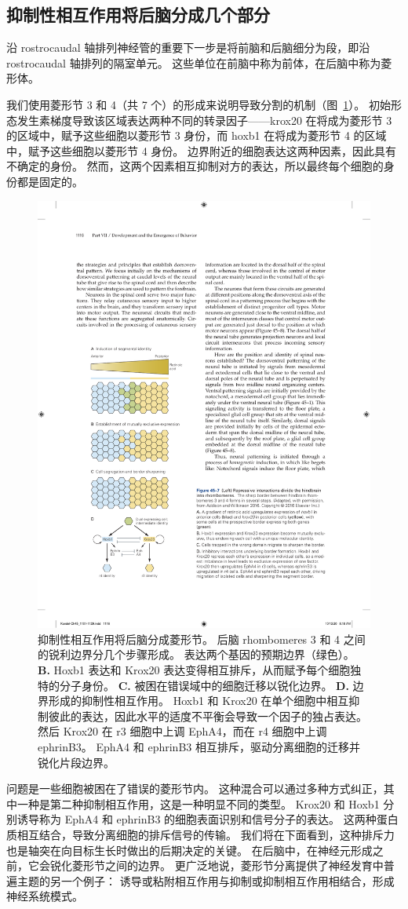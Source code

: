 \subsection{抑制性相互作用将后脑分成几个部分}

沿 rostrocaudal 轴排列神经管的重要下一步是将前脑和后脑细分为段，即沿 rostrocaudal 轴排列的隔室单元。
这些单位在前脑中称为前体，在后脑中称为菱形体。


我们使用菱形节 3 和 4（共 7 个）的形成来说明导致分割的机制（图~\ref{fig:45_7}）。
初始形态发生素梯度导致该区域表达两种不同的转录因子——krox20 在将成为菱形节 3 的区域中，赋予这些细胞以菱形节 3 身份，而 hoxb1 在将成为菱形节 4 的区域中，赋予这些细胞以菱形节 4 身份。
边界附近的细胞表达这两种因素，因此具有不确定的身份。
然而，这两个因素相互抑制对方的表达，所以最终每个细胞的身份都是固定的。


\begin{figure}[htbp]
	\centering
	\includegraphics[width=0.5\linewidth]{chap45/fig_45_7}
	\caption{抑制性相互作用将后脑分成菱形节。
		后脑 rhombomeres 3 和 4 之间的锐利边界分几个步骤形成\cite{addison2016segment}。
		表达两个基因的预期边界（绿色）。
		\textbf{B.} Hoxb1 表达和 Krox20 表达变得相互排斥，从而赋予每个细胞独特的分子身份。
		\textbf{C.} 被困在错误域中的细胞迁移以锐化边界。
		\textbf{D.} 边界形成的抑制性相互作用。
		Hoxb1 和 Krox20 在单个细胞中相互抑制彼此的表达，因此水平的适度不平衡会导致一个因子的独占表达。
		然后 Krox20 在 r3 细胞中上调 EphA4，而在 r4 细胞中上调 ephrinB3。
		EphA4 和 ephrinB3 相互排斥，驱动分离细胞的迁移并锐化片段边界。}
	\label{fig:45_7}
\end{figure}


问题是一些细胞被困在了错误的菱形节内。
这种混合可以通过多种方式纠正，其中一种是第二种抑制相互作用，这是一种明显不同的类型。
Krox20 和 Hoxb1 分别诱导称为 EphA4 和 ephrinB3 的细胞表面识别和信号分子的表达。
这两种蛋白质相互结合，导致分离细胞的排斥信号的传输。
我们将在下面看到，这种排斥力也是轴突在向目标生长时做出的后期决定的关键。
在后脑中，在神经元形成之前，它会锐化菱形节之间的边界。
更广泛地说，菱形节分离提供了神经发育中普遍主题的另一个例子：
诱导或粘附相互作用与抑制或抑制相互作用相结合，形成神经系统模式。



